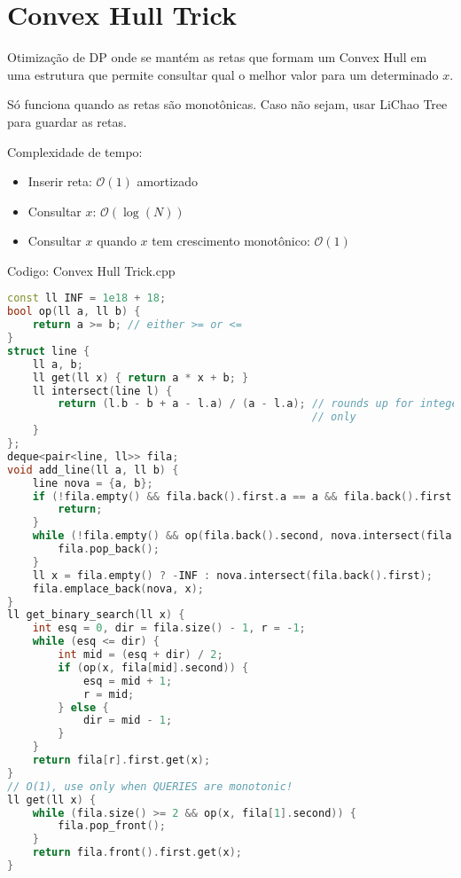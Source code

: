 \documentclass[10pt, a4paper, oneside]{book}
\begin{document}
\section{Convex Hull Trick}


Otimização de DP onde se mantém as retas que formam um Convex Hull em uma estrutura que permite consultar qual o melhor valor para um determinado \(x\).



Só funciona quando as retas são monotônicas. Caso não sejam, usar LiChao Tree para guardar as retas.



Complexidade de tempo:



\begin{itemize}
\item Inserir reta: $\mathcal{O}(1)$ amortizado
\item Consultar \(x\): $\mathcal{O}(\log(N))$
\item Consultar \(x\) quando \(x\) tem crescimento monotônico: $\mathcal{O}(1)$
\end{itemize}

\hfill

Codigo: Convex Hull Trick.cpp

\begin{lstlisting}[language=C++]
const ll INF = 1e18 + 18;
bool op(ll a, ll b) {
    return a >= b; // either >= or <=
}
struct line {
    ll a, b;
    ll get(ll x) { return a * x + b; }
    ll intersect(line l) {
        return (l.b - b + a - l.a) / (a - l.a); // rounds up for integer
                                                // only
    }
};
deque<pair<line, ll>> fila;
void add_line(ll a, ll b) {
    line nova = {a, b};
    if (!fila.empty() && fila.back().first.a == a && fila.back().first.b == b) {
        return;
    }
    while (!fila.empty() && op(fila.back().second, nova.intersect(fila.back().first))) {
        fila.pop_back();
    }
    ll x = fila.empty() ? -INF : nova.intersect(fila.back().first);
    fila.emplace_back(nova, x);
}
ll get_binary_search(ll x) {
    int esq = 0, dir = fila.size() - 1, r = -1;
    while (esq <= dir) {
        int mid = (esq + dir) / 2;
        if (op(x, fila[mid].second)) {
            esq = mid + 1;
            r = mid;
        } else {
            dir = mid - 1;
        }
    }
    return fila[r].first.get(x);
}
// O(1), use only when QUERIES are monotonic!
ll get(ll x) {
    while (fila.size() >= 2 && op(x, fila[1].second)) {
        fila.pop_front();
    }
    return fila.front().first.get(x);
}
\end{lstlisting}
\hfill
\end{document}
